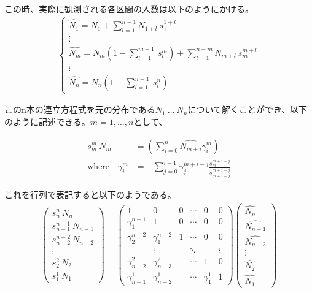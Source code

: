 \documentclass{jsarticle}
\begin{document}
この時、実際に観測される各区間の人数は以下のようにかける。
\begin{align*}
	\begin{cases}
	\hat{N_1} = N_1 + \sum_{l = 1}^{n-1}N_{1+l}\ s_1^{1+l} \\
	\vdots \\
	\hat{N_m} = N_m \left( 1 - \sum_{l = 1}^{m-1}\ s_l^m \right) + \sum_{l = 1}^{n-m} N_{m+l}\ s_m^{m+l}\\
	\vdots \\
	\hat{N_n} = N_n \left( 1 - \sum_{l = 1}^{n-1}\ s_l^n \right)
	\end{cases}
\end{align*}

このn本の連立方程式を元の分布である$N_1\ \dots\ N_n$について解くことができ、以下のように記述できる。$m = 1, \dots, n$として、

\begin{align*}
	s_m^m\ N_m &= \left( \sum_{i = 0}^{n} \hat{N_{m+i}} \gamma_i^m \right) \\[10pt]
	\text{where}\quad \gamma_i^m &= - \sum_{j = 0}^{i-1} \gamma_j^{m+i-j} \frac{s_m^{m+i-j}}{s_{m+i-j}^{m+i-j}}
\end{align*}

これを行列で表記すると以下のようである。
\begin{align*}
	\begin{pmatrix}
	s_n^n\ N_n\\[8pt]
	s_{n-1}^{n-1}\ N_{n-1}\\[8pt]
	s_{n-2}^{n-2}\ N_{n-2}\\[8pt]
	\vdots\\[8pt]
	s_2^2\ N_2\\[8pt]
	s_1^1\ N_1
	\end{pmatrix}=
	\begin{pmatrix}
	1 & 0 & 0 & \cdots &0&0\\
	\gamma_1^{n-1} & 1 & 0 & \cdots &0&0\\
	\gamma_2^{n-2} & \gamma_1^{n-2} & 1 & \cdots &0&0\\
	 & \vdots && \ddots&&\vdots\\
	 \gamma_{n-2}^2 & \gamma_{n-3}^2 &&\cdots &1 &0\\
	 \gamma_{n-1}^1 & \gamma_{n-2}^1 &&\cdots & \gamma_1^1 & 1
	\end{pmatrix}
	\begin{pmatrix}
	\hat{N_n}\\[8pt]
	\hat{N_{n-1}}\\[8pt]
	\hat{N_{n-2}}\\[8pt]
	\vdots\\[8pt]
	\hat{N_2}\\[8pt]
	\hat{N_1}
	\end{pmatrix}
\end{align*}
\end{document}

